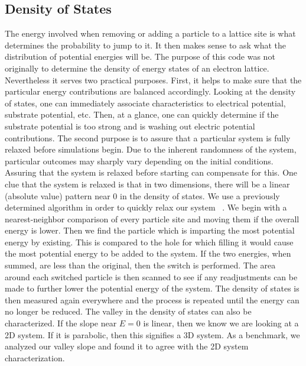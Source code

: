 \subsection {Density of States}
The energy involved when removing or adding a particle to a lattice site is what determines the probability to jump to it. It then makes sense to ask what the distribution of potential energies will be. The purpose of this code was not originally to determine the density of energy states of an electron lattice. Nevertheless it serves two practical purposes. First, it helps to make sure that the particular energy contributions are balanced accordingly. Looking at the density of states, one can immediately associate characteristics to electrical potential, substrate potential, etc. Then, at a glance, one can quickly determine if the substrate potential is too strong and is washing out electric potential contributions. The second purpose is to assure that a particular system is fully relaxed before simulations begin. Due to the inherent randomness of the system, particular outcomes may sharply vary depending on the initial conditions. Assuring that the system is relaxed before starting can compensate for this. One clue that the system is relaxed is that in two dimensions, there will be a linear (absolute value) pattern near 0 in the density of states. We use a previously determined algorithm in order to quickly relax our system ~\cite{Vinokur08}. We begin with a nearest-neighbor comparison of every particle site and moving them if the overall energy is lower. Then we find the particle which is imparting the most potential energy by existing. This is compared to the hole for which filling it would cause the most potential energy to be added to the system. If the two energies, when summed, are less than the original, then the switch is performed. The area around each switched particle is then scanned to see if any readjustments can be made to further lower the potential energy of the system. The density of states is then measured again everywhere and the process is repeated until the energy can no longer be reduced. The valley in the density of states can also be characterized. If the slope near $E=0$ is linear, then we know we are looking at a 2D system. If it is parabolic, then this signifies a 3D system. As a benchmark, we analyzed our valley slope and found it to agree with the 2D system characterization.



